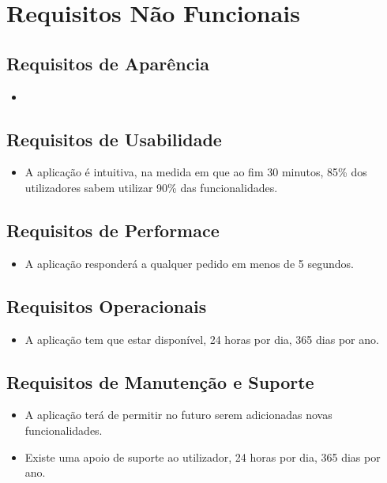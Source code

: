 \chapter{Requisitos Não Funcionais}
\section{Requisitos de Aparência}
\begin{itemize}
    \item 
\end{itemize}{}

\section{Requisitos de Usabilidade}
\begin{itemize}
    \item A aplicação é intuitiva, na medida em que ao fim 30 minutos, 85\% dos utilizadores sabem utilizar 90\% das funcionalidades.
\end{itemize}{}

\section{Requisitos de Performace}
\begin{itemize}
    \item A aplicação responderá a qualquer pedido em menos de 5 segundos.
\end{itemize}{}

\section{Requisitos Operacionais}
\begin{itemize}
    \item A aplicação tem que estar disponível, 24 horas por dia, 365 dias por ano.
\end{itemize}{}

\section{Requisitos de Manutenção e Suporte}
\begin{itemize}
    \item A aplicação terá de permitir no futuro serem adicionadas novas funcionalidades.
    \item Existe uma apoio de suporte ao utilizador, 24 horas por dia, 365 dias por ano.
\end{itemize}{}

